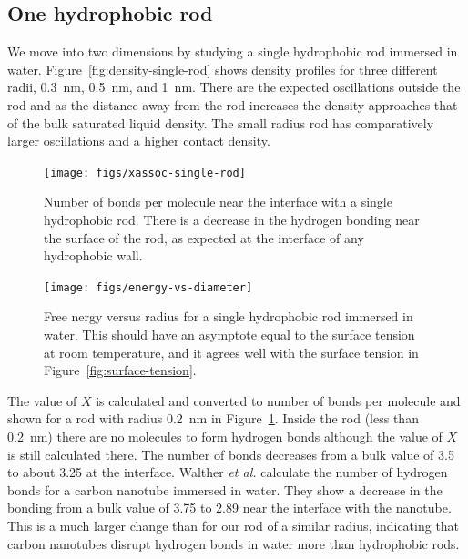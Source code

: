 \documentclass[letterpaper,twocolumn,amsmath,amssymb,prb]{revtex4-1}
\begin{document}
\subsection{One hydrophobic rod}

We move into two dimensions by studying a single hydrophobic rod
immersed in water. Figure~\ref{fig:density-single-rod} shows density
profiles for three different radii, 0.3~nm, 0.5~nm, and 1~nm. There are the
expected oscillations outside the rod and as the distance away from the rod
increases
the density approaches that of the bulk saturated liquid density. The small
radius
rod has comparatively larger oscillations and a higher contact density.

\begin{figure}
\begin{center}
\texttt{[image: figs/xassoc-single-rod]}
\end{center}
\caption{ Number of bonds per molecule near the interface with a single
hydrophobic rod. There is a decrease in the hydrogen bonding near the surface 
of the rod, as expected at the interface of any hydrophobic wall. }
\label{fig:xassoc-single-rod}
\end{figure}

\begin{figure}
\begin{center}
\texttt{[image: figs/energy-vs-diameter]}
\end{center}
\caption{ Free nergy versus radius for a single hydrophobic rod
immersed in water. This should have an asymptote equal to the surface
tension at room temperature, and it agrees well with the surface tension in
Figure~\ref{fig:surface-tension}. }
\label{fig:energy-vs-diameter}
\end{figure}

The value of $X$ is calculated and converted to number of bonds per molecule and 
shown for a rod with radius 0.2~nm in Figure~\ref{fig:xassoc-single-rod}. Inside the
rod (less than 0.2~nm) there are no molecules to form hydrogen bonds although the value
of $X$ is still calculated there. The number of bonds decreases from a bulk value of 3.5 
to about 3.25 at the interface. Walther \emph{et al.}\cite{walther2001carbon} 
calculate the number of hydrogen bonds for a carbon nanotube immersed in water.
They show a decrease in the bonding from a bulk value of 3.75 to 2.89 near the 
interface with the nanotube. This is a much larger change than for our 
rod of a similar radius, indicating that carbon nanotubes disrupt hydrogen
bonds in water more than hydrophobic rods.
\end{document}

